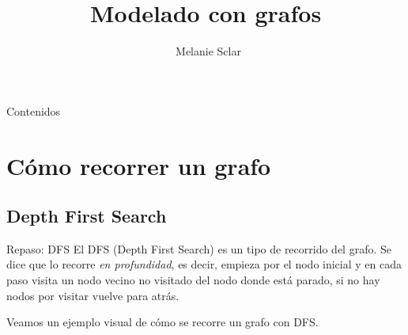 \documentclass[compress]{beamer}
\title[Modelado con grafos] %
{Modelado con grafos}
\author[Melanie Sclar] %
{~Melanie Sclar}
\institute[UBA] %
{
  Facultad de Ciencias Exactas y Naturales\\
  Universidad de Buenos Aires
}
\begin{document}
\begin{frame}
  \titlepage
\end{frame}

\begin{frame}{Contenidos}
  \tableofcontents
\end{frame}

\section{Cómo recorrer un grafo}
\subsection{Depth First Search}
\begin{frame}{Repaso: DFS}
El DFS (Depth First Search) es un tipo de recorrido del grafo. Se dice que lo recorre \textit{en profundidad}, es decir, empieza por el nodo inicial y en cada paso visita un nodo vecino no visitado del nodo donde está parado, si no hay nodos por visitar vuelve para atrás.

\bigskip
Veamos un ejemplo visual de cómo se recorre un grafo con DFS.
\end{frame}
\end{document}
